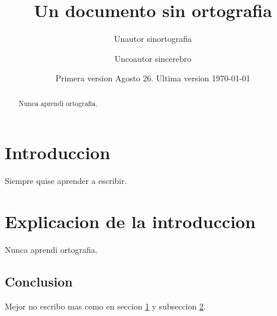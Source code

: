 \documentclass{article}
\begin{document}
    \title{Un documento sin ortografia}
    \author{Unautor sinortografia \and Uncoautor sincerebro}
    \date{Primera version Agosto 26. Ultima version \today}
    \maketitle

    \begin{abstract}
        Nunca aprendi ortografia.
    \end{abstract}

    \section{Introduccion}\label{sec.intro}
        Siempre quise aprender a escribir.

    \section{Explicacion de la introduccion}\label{sec.intro.explicacion}
        Nunca aprendi ortografia.

        \subsection{Conclusion}\label{sec.conclusion}
        Mejor no escribo mas como en seccion \ref{sec.intro} y subseccion \ref{sec.intro.explicacion}.
\end{document}
